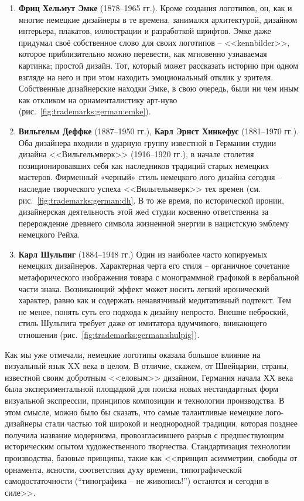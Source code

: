 \begin{enumerate}
\item \textbf{Фриц Хельмут Эмке} (1878--1965 гг.). Кроме создания логотипов, он, как и многие
  немецкие дизайнеры в те времена, занимался архитектурой, дизайном интерьера, плакатов, иллюстрации
  и разработкой шрифтов. Эмке даже придумал своё собственное слово для своих логотипов --
  <<kennbilder>>, которое приблизительно можно перевести, как мгновенно узнаваемая картинка; простой
  дизайн. Тот, который может рассказать историю при одном взгляде на него и при этом находить
  эмоциональный отклик у зрителя. Собственные дизайнерские находки Эмке, в свою очередь, были ни чем
  иным как откликом на орнаменталистику арт-нуво (рис.~\ref{fig:trademarks:german:emke}).
\item \textbf{Вильгельм Деффке} (1887--1950 гг.), \textbf{Карл Эрнст Хинкефус} (1881--1970 гг.). Оба
  дизайнера входили в ударную группу известной в Германии студии дизайна <<Вильгельмверк>> (1916--1920
  гг.), в начале столетия позиционировавших себя как наследников традиций старых немецких
  мастеров. Фирменный «черный» стиль немецкого лого дизайна сегодня -- наследие творческого успеха
  <<Вильгельмверк>> тех времен (см. рис.~\ref{fig:trademarks:german:dh}. В то же время, по
  исторической иронии, дизайнерская деятельность этой жеd студии косвенно ответственна за перерождение
  древнего символа жизненной энергии в нацистскую эмблему немецкого Рейха.
\item \textbf{Карл Шульпиг} (1884--1948 гг.) Один из наиболее часто копируемых немецких
  дизайнеров. Характерная черта его стиля -- органичное сочетание метафорического изображения товара
  с монограммной графикой в вербальной части знака. Возникающий эффект может носить легкий
  иронический характер, равно как и содержать ненавязчивый медитативный подтекст. Тем не менее,
  понять суть его подхода к дизайну непросто. Внешне неброский, стиль Шульпига требует даже от
  имитатора вдумчивого, вникающего отношения (рис.~\ref{fig:trademarks:german:shulpig}).
\end{enumerate}

Как мы уже отмечали, немецкие логотипы оказала большое влияние на визуальный язык XX века в целом. В
отличие, скажем, от Швейцарии, страны, известной своим добротным <<еловым>> дизайном, Германия начала
ХХ века была экспериментальной площадкой для поиска новых нестандартных форм визуальной экспрессии,
принципов композиции и технологии производства. В этом смысле, можно было бы сказать, что самые
талантливые немецкие лого-дизайнеры стали частью той широкой и неоднородной традиции, которая
позднее получила название модернизма, провозгласившего разрыв с предшествующим историческим опытом
художественного творчества. Стандартизация технологии производства, базовые принципы, такие как
<<принцип асимметрии, свободы от орнамента, ясности, соответствия духу времени, типографической
самодостаточности (``типографика – не живопись!'') остаются и сегодня в силе>>.\autocite[][8]{chihold2011}

